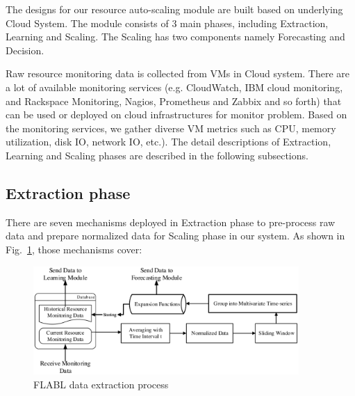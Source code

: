 \documentclass[runningheads]{llncs}
\begin{document}
\label{designing_system}

The designs for our resource auto-scaling module are built based on underlying Cloud System. The module consists of 3 main phases, including Extraction, Learning and Scaling. The Scaling has two components namely Forecasting and Decision.



Raw resource monitoring data is collected from VMs in Cloud system. There are a lot of available monitoring services (e.g. CloudWatch, IBM cloud monitoring, and Rackspace Monitoring, Nagios, Prometheus and Zabbix and so forth) that can be used or deployed on cloud infrastructures for monitor problem. Based on the monitoring services, we gather diverse VM metrics such as CPU, memory utilization, disk IO, network IO, etc.). The detail descriptions of Extraction, Learning and Scaling phases are described in the following subsections. 

\subsection{Extraction phase}
\label{extraction_phrase}

There are seven mechanisms deployed in Extraction phase to pre-process raw data and prepare normalized data for Scaling phase in our system. As shown in Fig.~\ref{FLABLextraction}, those mechanisms cover: 

\begin{figure}
	\begin{center}
		\includegraphics[width=0.9\textwidth]{images/pdf/Extraction_Module.eps}
		\caption{FLABL data extraction process}
		\label{FLABLextraction}
	\end{center}
\end{figure}
\end{document}
